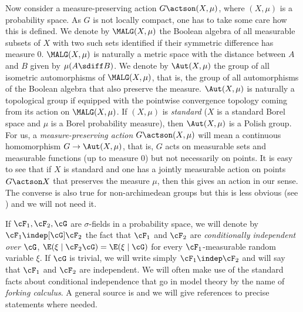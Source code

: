 Now consider a measure-preserving action $G \actson (X, \mu)$, where $(X, \mu)$ is a probability space. As $G$ is not locally compact, one has to take some care how this is defined. We denote by $\MALG(X, \mu)$ the Boolean algebra of all measurable subsets of $X$ with two such sets identified if their symmetric difference has measure $0$. $\MALG(X, \mu)$ is naturally a metric space with the distance between $A$ and $B$ given by $\mu(A \sdiff B)$. We denote by $\Aut(X, \mu)$ the group of all isometric automorphisms of $\MALG(X, \mu)$, that is, the group of all automorphisms of the Boolean algebra that also preserve the measure. $\Aut(X, \mu)$ is naturally a topological group if equipped with the pointwise convergence topology coming from its action on $\MALG(X, \mu)$. If $(X, \mu)$ is \emph{standard} (\ie $X$ is a standard Borel space and $\mu$ is a Borel probability measure), then $\Aut(X, \mu)$ is a Polish group. For us, a \emph{measure-preserving action $G \actson (X, \mu)$} will mean a continuous homomorphism $G \to \Aut(X, \mu)$, that is, $G$ acts on measurable sets and measurable functions (up to measure $0$) but not necessarily on points. It is easy to see that if $X$ is standard and one has a jointly measurable action on points $G \actson X$ that preserves the measure $\mu$, then this gives an action in our sense. The converse is also true for non-archimedean groups but this is less obvious (see \cite[Th.\,2.3]{Glasner2005a}) and we will not need it.

If $\cF_1, \cF_2, \cG$ are $\sigma$-fields in a probability space, we will denote by $\cF_1 \indep[\cG] \cF_2$ the fact that $\cF_1$ and $\cF_2$ are \emph{conditionally independent over $\cG$}, \ie $\E(\xi \mid \cF_2\cG) = \E(\xi \mid\nobreak \cG)$ for every $\cF_1$-measurable random variable $\xi$. If $\cG$ is trivial, we will write simply $\cF_1 \indep \cF_2$ and will say that $\cF_1$ and $\cF_2$ are independent. We will often make use of the standard facts about conditional independence that go in model theory by the name of \emph{forking calculus}. A general source is \cite[Chap.\,5]{Kallenberg2002} and we will give references to precise statements where needed.

